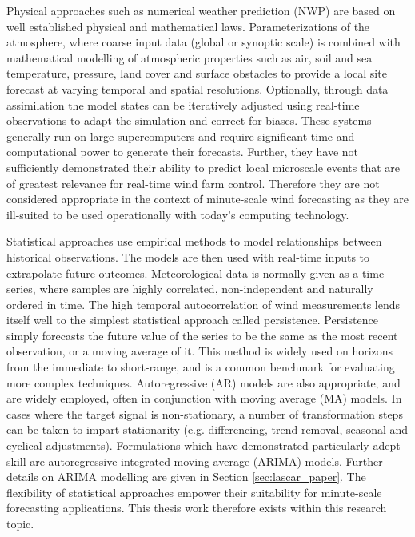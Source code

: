 Physical approaches such as numerical weather prediction (NWP) are based on well established physical and mathematical laws. Parameterizations of the atmosphere, where coarse input data (global or synoptic scale) is combined with mathematical modelling of atmospheric properties such as air, soil and sea temperature, pressure, land cover and surface obstacles to provide a local site forecast at varying temporal and spatial resolutions. Optionally, through data assimilation the model states can be iteratively adjusted using real-time observations to adapt the simulation and correct for biases. These systems generally run on large supercomputers and require significant time and computational power to generate their forecasts. Further, they have not sufficiently demonstrated their ability to predict local microscale events that are of greatest relevance for real-time wind farm control. Therefore they are not considered appropriate in the context of minute-scale wind forecasting as they are ill-suited to be used operationally with today's computing technology.

Statistical approaches use empirical methods to model relationships between historical observations. The models are then used with real-time inputs to extrapolate future outcomes. Meteorological data is normally given as a time-series, where samples are highly correlated, non-independent and naturally ordered in time. The high temporal autocorrelation of wind measurements lends itself well to the simplest statistical approach called persistence. Persistence simply forecasts the future value of the series to be the same as the most recent observation, or a moving average of it. This method is widely used on horizons from the immediate to short-range, and is a common benchmark for evaluating more complex techniques. Autoregressive (AR) models are also appropriate, and are widely employed, often in conjunction with moving average (MA) models. In cases where the target signal is non-stationary, a number of transformation steps can be taken to impart stationarity (e.g. differencing, trend removal, seasonal and cyclical adjustments). Formulations which have demonstrated particularly adept skill are autoregressive integrated moving average (ARIMA) models. Further details on ARIMA modelling are given in Section \ref{sec:lascar_paper}. The flexibility of statistical approaches empower their suitability for minute-scale forecasting applications. This thesis work therefore exists within this research topic.

